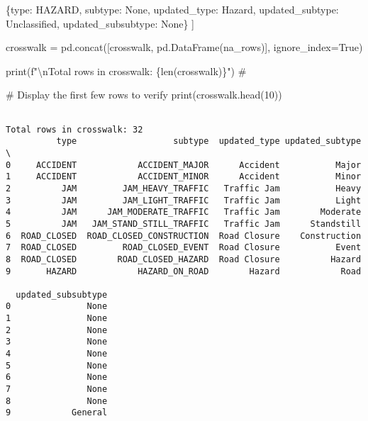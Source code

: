 \documentclass[
  letterpaper,
  DIV=11,
  numbers=noendperiod]{scrartcl}
\newenvironment{Shaded}{\begin{snugshade}}{\end{snugshade}}
\newcommand{\BuiltInTok}[1]{\textcolor[rgb]{0.00,0.23,0.31}{#1}}
\newcommand{\CharTok}[1]{\textcolor[rgb]{0.13,0.47,0.30}{#1}}
\newcommand{\CommentTok}[1]{\textcolor[rgb]{0.37,0.37,0.37}{#1}}
\newcommand{\DecValTok}[1]{\textcolor[rgb]{0.68,0.00,0.00}{#1}}
\newcommand{\NormalTok}[1]{\textcolor[rgb]{0.00,0.23,0.31}{#1}}
\newcommand{\OperatorTok}[1]{\textcolor[rgb]{0.37,0.37,0.37}{#1}}
\newcommand{\SpecialCharTok}[1]{\textcolor[rgb]{0.37,0.37,0.37}{#1}}
\newcommand{\SpecialStringTok}[1]{\textcolor[rgb]{0.13,0.47,0.30}{#1}}
\newcommand{\StringTok}[1]{\textcolor[rgb]{0.13,0.47,0.30}{#1}}
\newcommand{\VariableTok}[1]{\textcolor[rgb]{0.07,0.07,0.07}{#1}}
\begin{document}
\begin{Shaded}
\begin{Highlighting}[]
\NormalTok{    \{}\StringTok{\textquotesingle{}type\textquotesingle{}}\NormalTok{: }\StringTok{\textquotesingle{}HAZARD\textquotesingle{}}\NormalTok{, }\StringTok{\textquotesingle{}subtype\textquotesingle{}}\NormalTok{: }\VariableTok{None}\NormalTok{, }
     \StringTok{\textquotesingle{}updated\_type\textquotesingle{}}\NormalTok{: }\StringTok{\textquotesingle{}Hazard\textquotesingle{}}\NormalTok{, }\StringTok{\textquotesingle{}updated\_subtype\textquotesingle{}}\NormalTok{: }\StringTok{\textquotesingle{}Unclassified\textquotesingle{}}\NormalTok{, }\StringTok{\textquotesingle{}updated\_subsubtype\textquotesingle{}}\NormalTok{: }\VariableTok{None}\NormalTok{\}}
\NormalTok{]}

\NormalTok{crosswalk }\OperatorTok{=}\NormalTok{ pd.concat([crosswalk, pd.DataFrame(na\_rows)], ignore\_index}\OperatorTok{=}\VariableTok{True}\NormalTok{)}

\BuiltInTok{print}\NormalTok{(}\SpecialStringTok{f"}\CharTok{\textbackslash{}n}\SpecialStringTok{Total rows in crosswalk: }\SpecialCharTok{\{}\BuiltInTok{len}\NormalTok{(crosswalk)}\SpecialCharTok{\}}\SpecialStringTok{"}\NormalTok{)  }\CommentTok{\# }

\CommentTok{\# Display the first few rows to verify}
\BuiltInTok{print}\NormalTok{(crosswalk.head(}\DecValTok{10}\NormalTok{))}
\end{Highlighting}
\end{Shaded}

\begin{verbatim}

Total rows in crosswalk: 32
          type                   subtype  updated_type updated_subtype  \
0     ACCIDENT            ACCIDENT_MAJOR      Accident           Major   
1     ACCIDENT            ACCIDENT_MINOR      Accident           Minor   
2          JAM         JAM_HEAVY_TRAFFIC   Traffic Jam           Heavy   
3          JAM         JAM_LIGHT_TRAFFIC   Traffic Jam           Light   
4          JAM      JAM_MODERATE_TRAFFIC   Traffic Jam        Moderate   
5          JAM   JAM_STAND_STILL_TRAFFIC   Traffic Jam      Standstill   
6  ROAD_CLOSED  ROAD_CLOSED_CONSTRUCTION  Road Closure    Construction   
7  ROAD_CLOSED         ROAD_CLOSED_EVENT  Road Closure           Event   
8  ROAD_CLOSED        ROAD_CLOSED_HAZARD  Road Closure          Hazard   
9       HAZARD            HAZARD_ON_ROAD        Hazard            Road   

  updated_subsubtype  
0               None  
1               None  
2               None  
3               None  
4               None  
5               None  
6               None  
7               None  
8               None  
9            General  
\end{verbatim}
\end{document}
